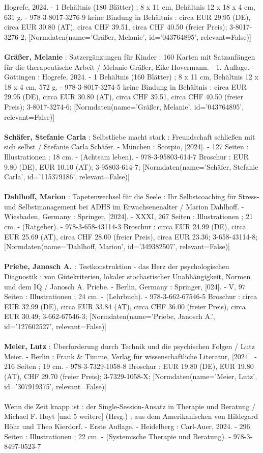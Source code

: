 \documentclass{article}
\begin{document}
\begin{multicols}{3}
Hogrefe, 2024. - 1 Behältnis (180 Blätter) ; 8 x 11 cm, Behältnis 12 x 18 x 4 cm, 631 g. - 978-3-8017-3276-9 keine Bindung in Behältnis : circa EUR 29.95 (DE), circa EUR 30.80 (AT), circa CHF 39.51, circa CHF 40.50 (freier Preis); 3-8017-3276-2; [Normdaten(name='Gräßer, Melanie', id='043764895', relevant=False)]\\\\\textbf{Gräßer, Melanie} : Satzergänzungen für Kinder : 160 Karten mit Satzanfängen für die therapeutische Arbeit / Melanie Gräßer, Eike Hovermann. - 1. Auflage. - Göttingen : Hogrefe, 2024. - 1 Behältnis (160 Blätter) ; 8 x 11 cm, Behältnis 12 x 18 x 4 cm, 572 g. - 978-3-8017-3274-5 keine Bindung in Behältnis : circa EUR 29.95 (DE), circa EUR 30.80 (AT), circa CHF 39.51, circa CHF 40.50 (freier Preis); 3-8017-3274-6; [Normdaten(name='Gräßer, Melanie', id='043764895', relevant=False)]\\\\\textbf{Schäfer, Stefanie Carla} : Selbstliebe macht stark : Freundschaft schließen mit sich selbst / Stefanie Carla Schäfer. - München : Scorpio, [2024]. - 127 Seiten : Illustrationen ; 18 cm. - (Achtsam leben). - 978-3-95803-614-7 Broschur : EUR 9.80 (DE), EUR 10.10 (AT); 3-95803-614-7; [Normdaten(name='Schäfer, Stefanie Carla', id='115379186', relevant=False)]\\\\\textbf{Dahlhoff, Marion} : Tapetenwechsel für die Seele : Ihr Selbstcoaching für Stress- und Selbstmanagement bei ADHS im Erwachsenenalter / Marion Dahlhoff. - Wiesbaden, Germany : Springer, [2024]. - XXXI, 267 Seiten : Illustrationen ; 21 cm. - (Ratgeber). - 978-3-658-43114-3 Broschur : circa EUR 24.99 (DE), circa EUR 25.69 (AT), circa CHF 28.00 (freier Preis), circa EUR 23.36; 3-658-43114-8; [Normdaten(name='Dahlhoff, Marion', id='349382507', relevant=False)]\\\\\textbf{Priebe, Janosch A.} : Testkonstruktion - das Herz der psychologischen Diagnostik : von Gütekriterien, lokaler stochastischer Unabhängigkeit, Normen und dem IQ / Janosch A. Priebe. - Berlin, Germany : Springer, [024]. - V, 97 Seiten : Illustrationen ; 24 cm. - (Lehrbuch). - 978-3-662-67546-5 Broschur : circa EUR 32.99 (DE), circa EUR 33.84 (AT), circa CHF 36.00 (freier Preis), circa EUR 30.49; 3-662-67546-3; [Normdaten(name='Priebe, Janosch A.', id='127602527', relevant=False)]\\\\\textbf{Meier, Lutz} : Überforderung durch Technik und die psychischen Folgen / Lutz Meier. - Berlin : Frank \& Timme, Verlag für wissenschaftliche Literatur, [2024]. - 216 Seiten ; 19 cm. - 978-3-7329-1058-8 Broschur : EUR 19.80 (DE), EUR 19.80 (AT), CHF 29.70 (freier Preis); 3-7329-1058-X; [Normdaten(name='Meier, Lutz', id='307919375', relevant=False)]\\\\Wenn die Zeit knapp ist : der Single-Session-Ansatz in Therapie und Beratung / Michael F. Hoyt [und 5 weitere] (Hrsg.) ; aus dem Amerikanischen von Hildegard Höhr und Theo Kierdorf. - Erste Auflage. - Heidelberg : Carl-Auer, 2024. - 296 Seiten : Illustrationen ; 22 cm. - (Systemische Therapie und Beratung). - 978-3-8497-0523-7 
\end{multicols}
\end{document}
